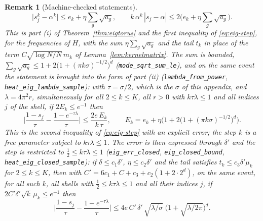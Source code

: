 \documentclass[11pt,a4paper]{article}
\theoremstyle{stmt}
\theoremstyle{defn}
\theoremstyle{rmk}
\newtheorem{remark}[theorem]{Remark}
\numberwithin{equation}{section}
\begin{document}
{\begin{remark}[Machine-checked statements]
\[
\big|s_j^k-\alpha^k\big|\le e_k+\eta\sum_g\sqrt{a_g},\qquad k\,\alpha^k\,|s_j-\alpha|\le2\Big(e_k+\eta\sum_g\sqrt{a_g}\Big).
\]
This is part (i) of Theorem~\ref{thm:eigtorus} and the first inequality of \eqref{eq:eig-step}, for the frequencies of $H$, with the sum $\eta\sum_g\sqrt{a_g}$ and the tail $t_k$ in place of the term $C\sqrt{\log N/N}\,m_k$ of Lemma~\ref{lem:kernelmatrix}. The sum is bounded, $\sum_g\sqrt{a_g}\le1+2\big(1+(\pi k\sigma)^{-1/2}\big)^d$ (\texttt{mode\_sqrt\_sum\_le}), and on the same event the statement is brought into the form of part (ii) (\texttt{lambda\_from\_power}, \texttt{heat\_eig\_lambda\_sample}): with $\tau=\sigma/2$, which is the $\sigma$ of this appendix, and $\lambda=4\pi^2r$, simultaneously for all $2\le k\le K$, all $r>0$ with $k\tau\lambda\le1$ and all indices $j$ of the shell, if $2E_k\le e^{-1}$ then
\[
\Big|\frac{1-s_j}{\tau}-\frac{1-e^{-\tau\lambda}}{\tau}\Big|\le\frac{2e\,E_k}{k\,\tau},\qquad E_k=e_k+\eta\Big(1+2\big(1+(\pi k\sigma)^{-1/2}\big)^d\Big).
\]
This is the second inequality of \eqref{eq:eig-step} with an explicit error; the step $k$ is a free parameter subject to $k\tau\lambda\le1$. The error is then expressed through $\delta'$ and the step is restricted to $\frac12\le k\tau\lambda\le1$ (\texttt{eig\_err\_closed}, \texttt{eig\_closed\_bound}, \texttt{heat\_eig\_closed\_sample}): if $\delta\le c_1\delta'$, $\eta\le c_2\delta'$ and the tail satisfies $t_k\le c_3\delta'\mu_k$ for $2\le k\le K$, then with $C'=6c_1+C+c_3+c_2(1+2\cdot2^d)$, on the same event, for all such $k$, all shells with $\frac12\le k\tau\lambda\le1$ and all their indices $j$, if $2C'\delta'\sqrt k\,\mu_k\le e^{-1}$ then
\[
\Big|\frac{1-s_j}{\tau}-\frac{1-e^{-\tau\lambda}}{\tau}\Big|\le4e\,C'\,\delta'\,\sqrt{\lambda/\sigma}\;\big(1+\sqrt{\lambda/2\pi}\big)^d .
\]

\end{remark}}
\end{document}
